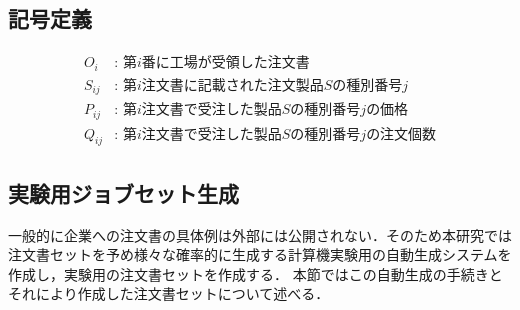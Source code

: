 \documentclass[fleqn]{jarticle}
\begin{document}
\subsection{記号定義}
\begin{align}
    O_{i} &\text{: 第$i$番に工場が受領した注文書} \nonumber\\
    S_{ij} &\text{: 第$i$注文書に記載された注文製品$S$の種別番号$j$} \nonumber\\
    P_{ij} &\text{: 第$i$注文書で受注した製品$S$の種別番号$j$の価格} \nonumber\\
    Q_{ij}&\text{: 第$i$注文書で受注した製品$S$の種別番号$j$の注文個数}\nonumber
\end{align}
\subsection{実験用ジョブセット生成}
一般的に企業への注文書の具体例は外部には公開されない．そのため本研究では注文書セットを予め様々な確率的に生成する計算機実験用の自動生成システムを作成し，実験用の注文書セットを作成する．
本節ではこの自動生成の手続きとそれにより作成した注文書セットについて述べる．
\end{document}
